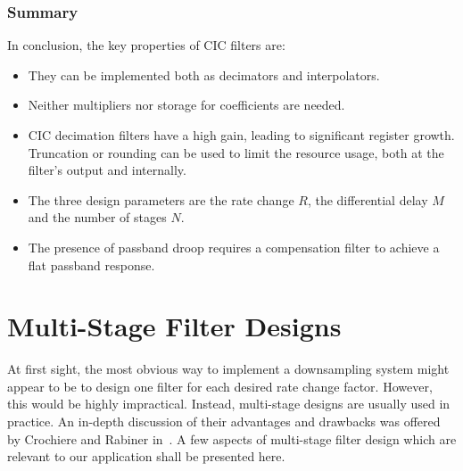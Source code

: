%
%
\subsubsection{Summary}
\label{subsubsec:cic:summary}

In conclusion, the key properties of CIC filters are:
\begin{itemize}\tightlist
    \item
        They can be implemented both as decimators and interpolators.
    \item
        Neither multipliers nor storage for coefficients are needed.
    \item
        CIC  decimation  filters have  a  high  gain, leading  to  significant
        register  growth.  Truncation  or rounding  can be  used to  limit the
        resource usage, both at the filter's output and internally.
    \item
        The three design parameters are  the rate change $R$, the differential
        delay $M$ and the number of stages $N$.
    \item
        The  presence of  passband  droop requires  a  compensation filter  to
        achieve a flat passband response.
\end{itemize}


%
%
\section{Multi-Stage Filter Designs} %
\label{sec:multi_stage_filter_designs}

At  first   sight,  the   most  obvious  way   to  implement   a  downsampling
system  might  appear  to be  to  design  one  filter  for each  desired  rate
change   factor.   However,   this  would   be  highly   impractical. Instead,
multi-stage  designs  are usually  used  in  practice. An in-depth  discussion
of  their  advantages and  drawbacks  was  offered  by Crochiere  and  Rabiner
in~\cite{crochiere-rabiner:multirate-dsp}. A few aspects of multi-stage filter
design which are relevant to our application shall be presented here.

